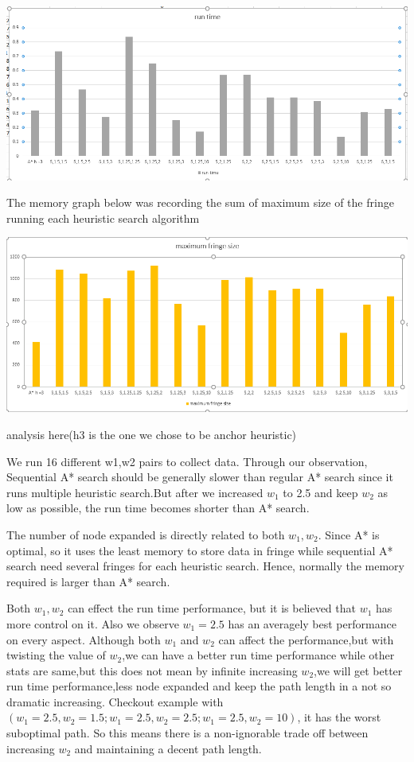 \documentclass[12pt, letterpaper]{article}
\begin{document}
\medskip

\noindent \includegraphics[scale=0.6]{"s-runtime"}

\medskip

The memory graph below was recording the sum of maximum size of the fringe running each heuristic search algorithm

\medskip

\noindent \includegraphics[scale=0.6]{"s-mem"}

\medskip


analysis here(h3 is the one we chose to be anchor heuristic)

\medskip

\noindent We run 16 different w1,w2 pairs to collect data. Through our observation, Sequential A* search should be generally slower than regular A* search since it runs multiple heuristic search.But after we increased $w_1$ to 2.5 and keep $w_2$ as low as possible, the run time becomes shorter than A* search. 
\medskip

\noindent The number of node expanded is directly related to both $w_1,w_2$. Since A* is optimal, so it uses the least memory to store data in fringe while sequential A* search need several fringes for each heuristic search. Hence, normally the memory required is larger than A* search. 
\medskip

\noindent Both $w_1,w_2$ can effect the run time performance, but it is believed that $w_1$ has more control on it. Also we observe $ w_1=2.5 $ has an averagely best performance on every aspect. Although both $ w_1 $ and $w_2$ can affect the performance,but with twisting the value of $w_2$,we can have a better run time performance while other stats are same,but this does not mean by infinite increasing $ w_2 $,we will get better run time performance,less node expanded and keep the path length in a not so dramatic increasing. Checkout example with $ (w_1=2.5,w_2=1.5;w_1=2.5,w_2=2.5;w_1=2.5,w_2=10) $, it has the worst suboptimal path. So this means there is a non-ignorable trade off between increasing $w_2$ and maintaining a decent path length.
\medskip
\end{document}
